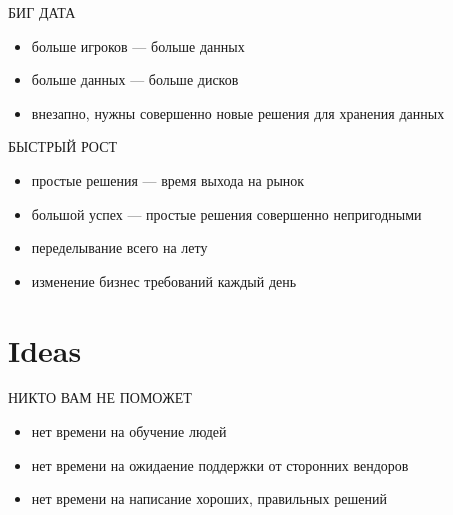 \documentclass[aspectratio=169]{beamer}
\begin{document}
\begin{frame}{БИГ ДАТА}
    \begin{itemize}
        \item больше игроков --- больше данных
        \item больше данных --- больше дисков
        \item внезапно, нужны совершенно новые решения для хранения данных
    \end{itemize}
\end{frame}

\begin{frame}{БЫСТРЫЙ РОСТ}
    \begin{itemize}
        \item простые решения --- время выхода на рынок
        \item большой успех --- простые решения совершенно непригодными
        \item переделывание всего на лету
        \item изменение бизнес требований каждый день
    \end{itemize}
\end{frame}

\section{Ideas}
{
\begin{frame}[plain]{}
\end{frame}
}
\begin{frame}{НИКТО ВАМ НЕ ПОМОЖЕТ}
    \begin{itemize}
        \item нет времени на обучение людей
        \item нет времени на ожидаение поддержки от сторонних вендоров
        \item нет времени на написание хороших, правильных решений
    \end{itemize}
\end{frame}
\end{document}

